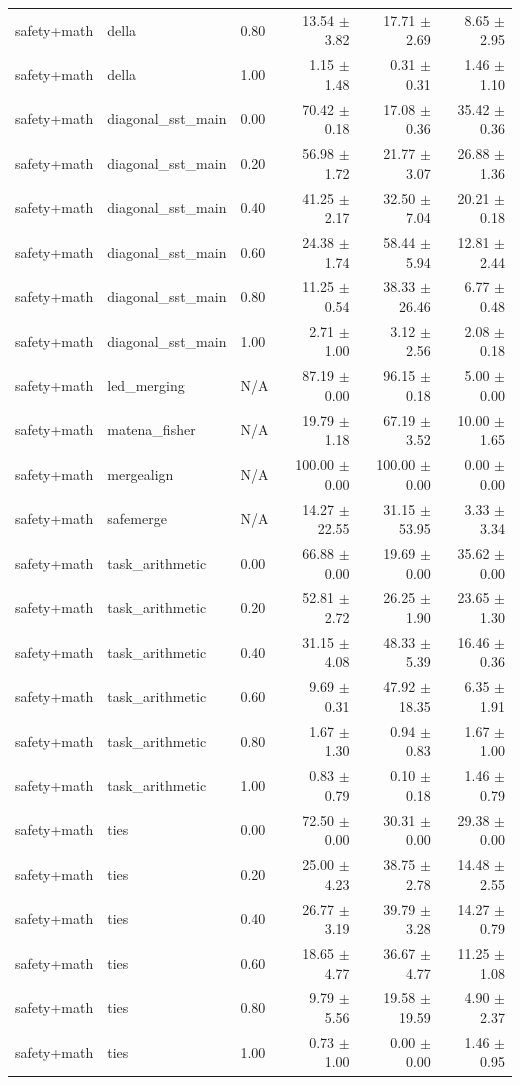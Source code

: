 \begin{table}[H]
{\begin{tabular}{lllrrr}
safety+math & della & 0.80 & 13.54 $\pm$ 3.82 & 17.71 $\pm$ 2.69 & 8.65 $\pm$ 2.95 \\
safety+math & della & 1.00 & 1.15 $\pm$ 1.48 & 0.31 $\pm$ 0.31 & 1.46 $\pm$ 1.10 \\
safety+math & diagonal\_sst\_main & 0.00 & 70.42 $\pm$ 0.18 & 17.08 $\pm$ 0.36 & 35.42 $\pm$ 0.36 \\
safety+math & diagonal\_sst\_main & 0.20 & 56.98 $\pm$ 1.72 & 21.77 $\pm$ 3.07 & 26.88 $\pm$ 1.36 \\
safety+math & diagonal\_sst\_main & 0.40 & 41.25 $\pm$ 2.17 & 32.50 $\pm$ 7.04 & 20.21 $\pm$ 0.18 \\
safety+math & diagonal\_sst\_main & 0.60 & 24.38 $\pm$ 1.74 & 58.44 $\pm$ 5.94 & 12.81 $\pm$ 2.44 \\
safety+math & diagonal\_sst\_main & 0.80 & 11.25 $\pm$ 0.54 & 38.33 $\pm$ 26.46 & 6.77 $\pm$ 0.48 \\
safety+math & diagonal\_sst\_main & 1.00 & 2.71 $\pm$ 1.00 & 3.12 $\pm$ 2.56 & 2.08 $\pm$ 0.18 \\
safety+math & led\_merging & N/A & 87.19 $\pm$ 0.00 & 96.15 $\pm$ 0.18 & 5.00 $\pm$ 0.00 \\
safety+math & matena\_fisher & N/A & 19.79 $\pm$ 1.18 & 67.19 $\pm$ 3.52 & 10.00 $\pm$ 1.65 \\
safety+math & mergealign & N/A & 100.00 $\pm$ 0.00 & 100.00 $\pm$ 0.00 & 0.00 $\pm$ 0.00 \\
safety+math & safemerge & N/A & 14.27 $\pm$ 22.55 & 31.15 $\pm$ 53.95 & 3.33 $\pm$ 3.34 \\
safety+math & task\_arithmetic & 0.00 & 66.88 $\pm$ 0.00 & 19.69 $\pm$ 0.00 & 35.62 $\pm$ 0.00 \\
safety+math & task\_arithmetic & 0.20 & 52.81 $\pm$ 2.72 & 26.25 $\pm$ 1.90 & 23.65 $\pm$ 1.30 \\
safety+math & task\_arithmetic & 0.40 & 31.15 $\pm$ 4.08 & 48.33 $\pm$ 5.39 & 16.46 $\pm$ 0.36 \\
safety+math & task\_arithmetic & 0.60 & 9.69 $\pm$ 0.31 & 47.92 $\pm$ 18.35 & 6.35 $\pm$ 1.91 \\
safety+math & task\_arithmetic & 0.80 & 1.67 $\pm$ 1.30 & 0.94 $\pm$ 0.83 & 1.67 $\pm$ 1.00 \\
safety+math & task\_arithmetic & 1.00 & 0.83 $\pm$ 0.79 & 0.10 $\pm$ 0.18 & 1.46 $\pm$ 0.79 \\
safety+math & ties & 0.00 & 72.50 $\pm$ 0.00 & 30.31 $\pm$ 0.00 & 29.38 $\pm$ 0.00 \\
safety+math & ties & 0.20 & 25.00 $\pm$ 4.23 & 38.75 $\pm$ 2.78 & 14.48 $\pm$ 2.55 \\
safety+math & ties & 0.40 & 26.77 $\pm$ 3.19 & 39.79 $\pm$ 3.28 & 14.27 $\pm$ 0.79 \\
safety+math & ties & 0.60 & 18.65 $\pm$ 4.77 & 36.67 $\pm$ 4.77 & 11.25 $\pm$ 1.08 \\
safety+math & ties & 0.80 & 9.79 $\pm$ 5.56 & 19.58 $\pm$ 19.59 & 4.90 $\pm$ 2.37 \\
safety+math & ties & 1.00 & 0.73 $\pm$ 1.00 & 0.00 $\pm$ 0.00 & 1.46 $\pm$ 0.95 \\
\bottomrule
\end{tabular}
}
\end{table}


